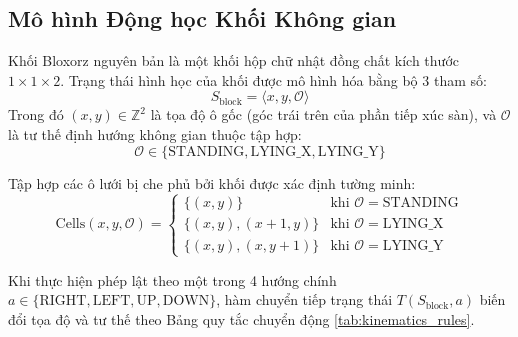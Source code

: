 \subsection{Mô hình Động học Khối Không gian}
\label{subsec:kinematics}
Khối Bloxorz nguyên bản là một khối hộp chữ nhật đồng chất kích thước
$1 \times 1 \times 2$. Trạng thái hình học của khối được mô hình hóa
bằng bộ $3$ tham số:
\begin{equation}
    S_{\text{block}} = \langle x, y, \mathcal{O} \rangle
\end{equation}
Trong đó $(x, y) \in \mathbb{Z}^2$ là tọa độ ô gốc (góc trái trên của
phần tiếp xúc sàn), và $\mathcal{O}$ là tư thế định hướng không gian
thuộc tập hợp:
\begin{equation}
    \mathcal{O} \in \{\text{STANDING}, \text{LYING\_X}, \text{LYING\_Y}\}
\end{equation}

Tập hợp các ô lưới bị che phủ bởi khối được xác định tường minh:
\begin{equation}
    \text{Cells}(x, y, \mathcal{O}) =
    \begin{cases}
        \{(x, y)\} & \text{khi } \mathcal{O} = \text{STANDING} \\
        \{(x, y), (x+1, y)\} & \text{khi } \mathcal{O} = \text{LYING\_X} \\
        \{(x, y), (x, y+1)\} & \text{khi } \mathcal{O} = \text{LYING\_Y}
    \end{cases}
\end{equation}

Khi thực hiện phép lật theo một trong 4 hướng chính
$a \in \{\text{RIGHT}, \text{LEFT}, \text{UP}, \text{DOWN}\}$,
hàm chuyển tiếp trạng thái $T(S_{\text{block}}, a)$ biến đổi tọa độ và tư thế
theo Bảng quy tắc chuyển động \ref{tab:kinematics_rules}.

